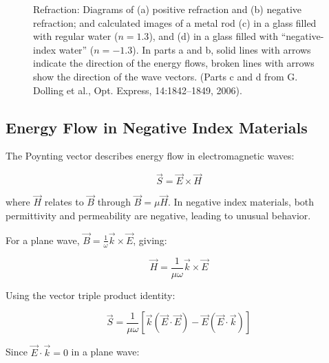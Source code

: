\documentclass[
  a4paper,
]{book}
\begin{document}
\begin{figure}


\caption{\label{fig-negative-refraction}Refraction: Diagrams of (a)
positive refraction and (b) negative refraction; and calculated images
of a metal rod (c) in a glass filled with regular water (\(n = 1.3\)),
and (d) in a glass filled with ``negative-index water'' (\(n = -1.3\)).
In parts a and b, solid lines with arrows indicate the direction of the
energy flows, broken lines with arrows show the direction of the wave
vectors. (Parts c and d from G. Dolling et al., Opt. Express,
14:1842--1849, 2006).}

\end{figure}%

\subsection{Energy Flow in Negative Index
Materials}\label{energy-flow-in-negative-index-materials}

The Poynting vector describes energy flow in electromagnetic waves:

\[ \vec{S} = \vec{E} \times \vec{H} \]

where \(\vec{H}\) relates to \(\vec{B}\) through
\(\vec{B} = \mu \vec{H}\). In negative index materials, both
permittivity and permeability are negative, leading to unusual behavior.

For a plane wave, \(\vec{B} = \frac{1}{\omega} \vec{k} \times \vec{E}\),
giving:

\[ \vec{H} = \frac{1}{\mu \omega} \vec{k} \times \vec{E} \]

Using the vector triple product identity:

\[ \vec{S} = \frac{1}{\mu \omega} \left[ \vec{k} (\vec{E} \cdot \vec{E}) - \vec{E} (\vec{E} \cdot \vec{k}) \right] \]

Since \(\vec{E} \cdot \vec{k} = 0\) in a plane wave:
\end{document}
